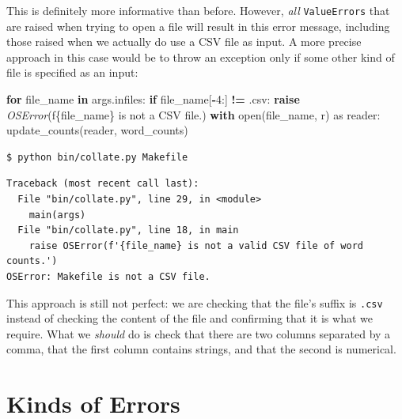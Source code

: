 \documentclass[
]{krantz}
\makeatletter
\newenvironment{Shaded}{\begin{snugshade}}{\end{snugshade}}
\newcommand{\BuiltInTok}[1]{#1}
\newcommand{\ControlFlowTok}[1]{\textcolor[rgb]{0.13,0.29,0.53}{\textbf{#1}}}
\newcommand{\DecValTok}[1]{\textcolor[rgb]{0.00,0.00,0.81}{#1}}
\newcommand{\ImportTok}[1]{#1}
\newcommand{\KeywordTok}[1]{\textcolor[rgb]{0.13,0.29,0.53}{\textbf{#1}}}
\newcommand{\NormalTok}[1]{#1}
\newcommand{\OperatorTok}[1]{\textcolor[rgb]{0.81,0.36,0.00}{\textbf{#1}}}
\newcommand{\PreprocessorTok}[1]{\textcolor[rgb]{0.56,0.35,0.01}{\textit{#1}}}
\newcommand{\SpecialCharTok}[1]{\textcolor[rgb]{0.00,0.00,0.00}{#1}}
\newcommand{\SpecialStringTok}[1]{\textcolor[rgb]{0.31,0.60,0.02}{#1}}
\newcommand{\StringTok}[1]{\textcolor[rgb]{0.31,0.60,0.02}{#1}}
\newenvironment{kframe}{%
\medskip{}
\setlength{\fboxsep}{.8em}
 \def\at@end@of@kframe{}%
 \ifinner\ifhmode%
  \def\at@end@of@kframe{\end{minipage}}%
  \begin{minipage}{\columnwidth}%
 \fi\fi%
 \def\FrameCommand##1{\hskip\@totalleftmargin \hskip-\fboxsep
 \colorbox{shadecolor}{##1}\hskip-\fboxsep
     \hskip-\linewidth \hskip-\@totalleftmargin \hskip\columnwidth}%
 \MakeFramed {\advance\hsize-\width
   \@totalleftmargin\z@ \linewidth\hsize
   \@setminipage}}%
 {\par\unskip\endMakeFramed%
 \at@end@of@kframe}
\renewenvironment{Shaded}{\begin{kframe}}{\end{kframe}}
\makeatother
\begin{document}
This is definitely more informative than before.
However,
\emph{all} \texttt{ValueErrors} that are raised when trying to open a file
will result in this error message,
including those raised when we actually do use a CSV file as input.
A more precise approach in this case would be to throw an exception
only if some other kind of file is specified as an input:

\begin{Shaded}
\begin{Highlighting}[]
\ControlFlowTok{for}\NormalTok{ file\_name }\KeywordTok{in}\NormalTok{ args.infiles:}
    \ControlFlowTok{if}\NormalTok{ file\_name[}\OperatorTok{{-}}\DecValTok{4}\NormalTok{:] }\OperatorTok{!=} \StringTok{\textquotesingle{}.csv\textquotesingle{}}\NormalTok{:}
        \ControlFlowTok{raise} \PreprocessorTok{OSError}\NormalTok{(}\SpecialStringTok{f\textquotesingle{}}\SpecialCharTok{\{}\NormalTok{file\_name}\SpecialCharTok{\}}\SpecialStringTok{ is not a CSV file.\textquotesingle{}}\NormalTok{)}
    \ControlFlowTok{with} \BuiltInTok{open}\NormalTok{(file\_name, }\StringTok{\textquotesingle{}r\textquotesingle{}}\NormalTok{) }\ImportTok{as}\NormalTok{ reader:}
\NormalTok{        update\_counts(reader, word\_counts)}
\end{Highlighting}
\end{Shaded}

\begin{verbatim}
$ python bin/collate.py Makefile
\end{verbatim}

\begin{verbatim}
Traceback (most recent call last):
  File "bin/collate.py", line 29, in <module>
    main(args)
  File "bin/collate.py", line 18, in main
    raise OSError(f'{file_name} is not a valid CSV file of word counts.')
OSError: Makefile is not a CSV file.
\end{verbatim}

This approach is still not perfect:
we are checking that the file's suffix is \texttt{.csv}
instead of checking the content of the file
and confirming that it is what we require.
What we \emph{should} do is check that there are two columns separated by a comma,
that the first column contains strings,
and that the second is numerical.

\hypertarget{errors-kind}{%
\section{Kinds of Errors}\label{errors-kind}}
\end{document}
